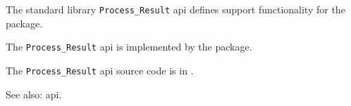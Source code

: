 
The standard library {\tt Process\_Result} api defines support functionality for the  package.

The {\tt Process\_Result} api is implemented by the  package.

The {\tt Process\_Result} api source code is in .

See also:   api.

